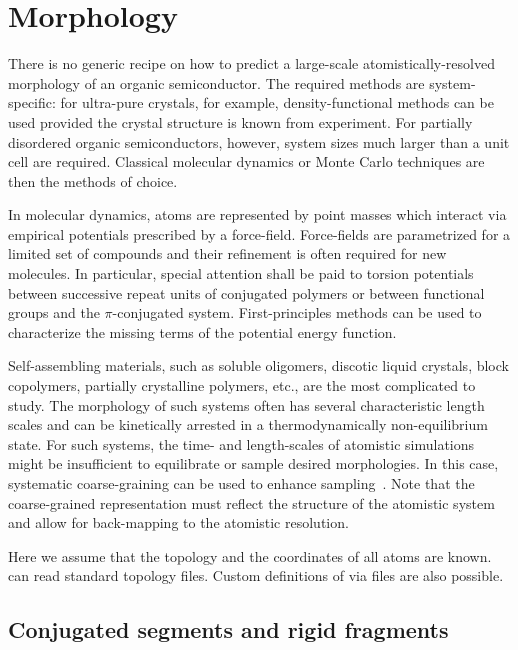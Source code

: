 \chapter{Morphology}
\label{sec:morphology}

There is no generic recipe on how to predict a large-scale atomistically-resolved morphology of an organic semiconductor. The required methods are system-specific: for ultra-pure crystals, for example, density-functional methods can be used provided the crystal structure is known from experiment. For partially disordered organic semiconductors, however, system sizes much larger than a unit cell  are required. Classical molecular dynamics or Monte Carlo techniques are then the methods of choice. 

In molecular dynamics, atoms are represented by point masses which interact via empirical potentials prescribed by a force-field. Force-fields are parametrized for a limited set of compounds and their refinement is often required for new molecules. In particular, special attention shall be paid to torsion potentials between successive repeat units of conjugated polymers or between functional groups and the $\pi$-conjugated system. First-principles methods can be used to characterize the missing terms of the potential energy function. 

Self-assembling materials, such as soluble oligomers, discotic liquid crystals, block copolymers, partially crystalline polymers, etc., are the most complicated to study. The morphology of such systems often has several characteristic length scales and can be kinetically arrested in a thermodynamically non-equilibrium state. For such systems, the time- and length-scales of atomistic simulations might be insufficient to equilibrate or sample desired morphologies. In this case, systematic coarse-graining can be used to enhance sampling~\cite{ruhle_versatile_2009}. Note that the coarse-grained representation must reflect the structure of the atomistic system and allow for back-mapping to the atomistic resolution.

Here we assume that the topology and the coordinates of all atoms are known. \votcactp can read standard \gromacs topology files. Custom definitions of  via \xml files are also possible.


\section{Conjugated segments and rigid fragments}
\label{sec:segments}

